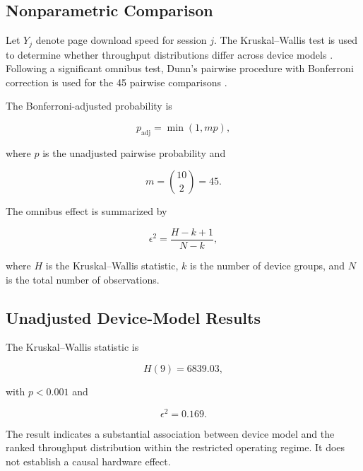 \documentclass[conference]{IEEEtran}
\begin{document}
\subsection{Nonparametric Comparison}

Let $Y_j$ denote page download speed for session $j$. The Kruskal--Wallis test is used to determine whether throughput distributions differ across device models \cite{b8}. Following a significant omnibus test, Dunn's pairwise procedure with Bonferroni correction is used for the 45 pairwise comparisons \cite{b9}.

The Bonferroni-adjusted probability is

\begin{equation}
p_{\mathrm{adj}} =
\min(1,mp),
\end{equation}

where $p$ is the unadjusted pairwise probability and

\begin{equation}
m=\binom{10}{2}=45.
\end{equation}

The omnibus effect is summarized by

\begin{equation}
\epsilon^2 =
\frac{H-k+1}{N-k},
\end{equation}

where $H$ is the Kruskal--Wallis statistic, $k$ is the number of device groups, and $N$ is the total number of observations.

\subsection{Unadjusted Device-Model Results}

The Kruskal--Wallis statistic is

\begin{equation}
H(9)=6839.03,
\end{equation}

with $p<0.001$ and

\begin{equation}
\epsilon^2=0.169.
\end{equation}

The result indicates a substantial association between device model and the ranked throughput distribution within the restricted operating regime. It does not establish a causal hardware effect.
\end{document}
